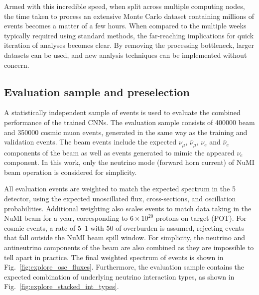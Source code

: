 Armed with this incredible speed, when split across multiple computing nodes, the time taken to
process an extensive Monte Carlo dataset containing millions of events becomes a matter of a few
hours. When compared to the multiple weeks typically required using standard methods, the
far-reaching implications for quick iteration of analyses becomes clear. By removing the
processing bottleneck, larger datasets can be used, and new analysis techniques can be implemented
without concern.

\subsection{Evaluation sample and preselection} %
\label{sec:cvn_results_sample} %

A statistically independent sample of events is used to evaluate the combined performance of the
trained CNNs. The evaluation sample consists of 400000 beam and 350000 cosmic muon events,
generated in the same way as the training and validation events. The beam events include the
expected $\nu_{\mu}$, $\bar{\nu}_{\mu}$, $\nu_{e}$ and $\bar{\nu}_{e}$ components of the beam as
well as events generated to mimic the appeared $\nu_{e}$ component. In this work, only the
neutrino mode (forward horn current) of NuMI beam operation is considered for simplicity.

All evaluation events are weighted to match the expected spectrum in the \unit{5}{}
\chipsfive detector, using the expected unoscillated flux, cross-sections, and oscillation
probabilities. Additional weighting also scales events to match data taking in the NuMI beam for a
year, corresponding to $6\times 10^{20}$ protons on target (POT). For cosmic events, a rate of
\unit{5.1}{} with \unit{50}{} of overburden is assumed, rejecting events
that fall outside the NuMI beam spill window. For simplicity, the neutrino and antineutrino
components of the beam are also combined as they are impossible to tell apart in practice. The
final weighted spectrum of events is shown in Fig.~\ref{fig:explore_osc_fluxes}. Furthermore, the
evaluation sample contains the expected combination of underlying neutrino interaction types, as
shown in Fig.~\ref{fig:explore_stacked_int_types}.


